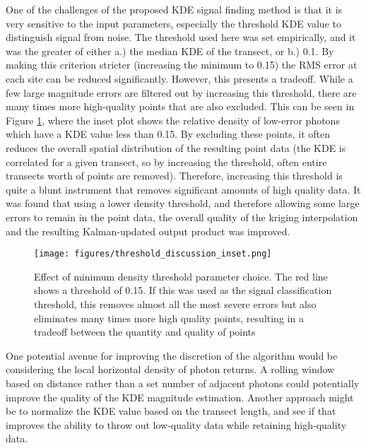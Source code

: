 One of the challenges of the proposed KDE signal finding method is that it is very sensitive to the input parameters, especially the threshold KDE value to distinguish signal from noise. The threshold used here was set empirically, and it was the greater of either a.) the median KDE of the transect, or b.) 0.1. By making this criterion stricter (increasing the minimum to 0.15) the RMS error at each site can be reduced significantly. However, this presents a tradeoff. While a few large magnitude errors are filtered out by increasing this threshold, there are many times more high-quality points that are also excluded. This can be seen in Figure \ref{fig:zoomed-inset-error}, where the inset plot shows the relative density of low-error photons which have a KDE value less than 0.15. By excluding these points, it often reduces the overall spatial distribution of the resulting point data (the KDE is correlated for a given transect, so by increasing the threshold, often entire transects worth of points are removed). Therefore, increasing this threshold is quite a blunt instrument that removes significant amounts of high quality data. It was found that using a lower density threshold, and therefore allowing some large errors to remain in the point data, the overall quality of the kriging interpolation and the resulting Kalman-updated output product was improved. 

\begin{figure}[htbp]
    \centering
    \texttt{[image: figures/threshold\_discussion\_inset.png]}
    \caption[Effect of minimum density threshold parameter choice]{Effect of minimum density threshold parameter choice. The red line shows a threshold of 0.15. If this was used as the signal classification threshold, this removes almost all the most severe errors but also eliminates many times more high quality points, resulting in a tradeoff between the quantity and quality of points}
    \label{fig:zoomed-inset-error}
\end{figure}

One potential avenue for improving the discretion of the algorithm would be considering the local horizontal density of photon returns. A rolling window based on distance rather than a set number of adjacent photons could potentially improve the quality of the KDE magnitude estimation. Another approach might be to normalize the KDE value based on the transect length, and see if that improves the ability to throw out low-quality data while retaining high-quality data.

